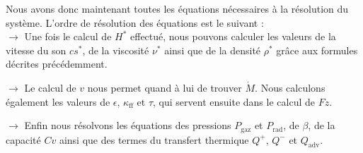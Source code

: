 Nous avons donc maintenant toutes les équations  nécessaires à  la résolution du système. L'ordre de résolution des équations est le suivant :  \\

 $\rightarrow$ Une fois le calcul de $H^{*}$ effectué, nous pouvons calculer les valeurs de la vitesse du son $cs^{*}$, de la viscosité $\nu^{*}$ ainsi que de la densité $\rho^{*}$ grâce aux formules décrites précédemment.   

 $\rightarrow$ Le calcul de $v$ nous permet quand à lui de trouver $\dot{M}$. Nous calculons également les valeurs de $\epsilon$,  $\kappa_\textrm{ff}$ et $\tau$, qui servent ensuite dans le calcul de $Fz$.
 
 $\rightarrow$ Enfin nous résolvons les équations des pressions $P_\textrm{gaz}$ et $P_\textrm{rad}$, de $\beta$,  de la capacité $Cv$ ainsi que des termes du transfert thermique $Q^{+}$, $Q^{-}$ et $Q_\textrm{adv}$.

